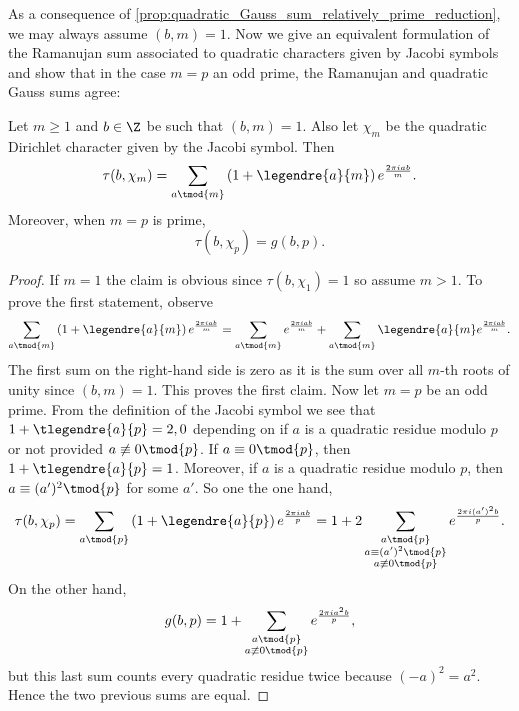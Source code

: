         As a consequence of \cref{prop:quadratic_Gauss_sum_relatively_prime_reduction}, we may always assume $(b,m) = 1$. Now we give an equivalent formulation of the Ramanujan sum associated to quadratic characters given by Jacobi symbols and show that in the case $m = p$ an odd prime, the Ramanujan and quadratic Gauss sums agree:

        \begin{proposition}\label{prop:Gauss_sum_equivalence_for_primes}
          Let $m \ge 1$ and $b \in \Z$ be such that $(b,m) = 1$. Also let $\chi_{m}$ be the quadratic Dirichlet character given by the Jacobi symbol. Then
          \[
            \tau(b,\chi_{m}) = \sum_{a \tmod{m}}\left(1+\legendre{a}{m}\right)e^{\frac{2\pi iab}{m}}.
          \]
          Moreover, when $m = p$ is prime,
          \[
            \tau(b,\chi_{p}) = g(b,p).
          \]
        \end{proposition}
        \begin{proof}
          If $m = 1$ the claim is obvious since $\tau(b,\chi_{1}) = 1$ so assume $m > 1$. To prove the first statement, observe
          \[
            \sum_{a \tmod{m}}\left(1+\legendre{a}{m}\right)e^{\frac{2\pi iab}{m}} = \sum_{a \tmod{m}}e^{\frac{2\pi iab}{m}}+\sum_{a \tmod{m}}\legendre{a}{m}e^{\frac{2\pi iab}{m}}.
          \]
          The first sum on the right-hand side is zero as it is the sum over all $m$-th roots of unity since $(b,m) = 1$. This proves the first claim. Now let $m = p$ be an odd prime. From the definition of the Jacobi symbol we see that $1+\tlegendre{a}{p} = 2,0$ depending on if $a$ is a quadratic residue modulo $p$ or not provided $a \not\equiv 0 \tmod{p}$. If $a \equiv 0 \tmod{p}$, then $1+\tlegendre{a}{p} = 1$. Moreover, if $a$ is a quadratic residue modulo $p$, then $a \equiv (a')^{2} \tmod{p}$ for some $a'$. So one the one hand,
          \[
            \tau(b,\chi_{p}) = \sum_{a \tmod{p}}\left(1+\legendre{a}{p}\right)e^{\frac{2\pi iab}{p}} = 1+2\sum_{\substack{a \tmod{p} \\ a \equiv (a')^{2} \tmod{p} \\ a \not\equiv 0 \tmod{p}}}e^{\frac{2\pi i(a')^{2}b}{p}}.
          \]
          On the other hand,
          \[
            g(b,p) = 1+\sum_{\substack{a \tmod{p} \\ a \not\equiv 0 \tmod{p}}}e^{\frac{2\pi ia^{2}b}{p}},
          \]
          but this last sum counts every quadratic residue twice because $(-a)^{2} = a^{2}$. Hence the two previous sums are equal.
        \end{proof}

